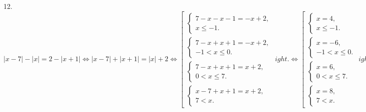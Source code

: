12. $|x-7|-|x|=2-|x+1|\Leftrightarrow|x-7|+|x+1|=|x|+2\Leftrightarrow \left[\begin{array}{l}\begin{cases} 7-x-x-1=-x+2,\\ x\leqslant-1.\end{cases}\\
\begin{cases} 7-x+x+1=-x+2,\\ -1<x\leqslant0.\end{cases}\\ \begin{cases} 7-x+x+1=x+2,\\ 0<x\leqslant7.\end{cases}\\
\begin{cases} x-7+x+1=x+2,\\ 7< x.\end{cases}\end{array}
ight.\Leftrightarrow \left[\begin{array}{l}\begin{cases} x=4,\\ x\leqslant-1.\end{cases}\\
\begin{cases} x=-6,\\ -1<x\leqslant0.\end{cases}\\ \begin{cases} x=6,\\ 0<x\leqslant7.\end{cases}\\
\begin{cases} x=8,\\ 7< x.\end{cases}\end{array}
ight.\Leftrightarrow x\in\{6; 8\}.$\\
